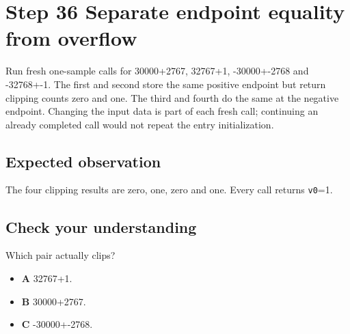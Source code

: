\section{Step 36 Separate endpoint equality from overflow}\label{pcm-s36}

Run fresh one-sample calls for 30000+2767, 32767+1, -30000+-2768 and -32768+-1. The first and second store the same positive endpoint but return clipping counts zero and one. The third and fourth do the same at the negative endpoint. Changing the input data is part of each fresh call; continuing an already completed call would not repeat the entry initialization.

\subsection{Expected observation}
The four clipping results are zero, one, zero and one. Every call returns \texttt{v0}=1.

\subsection{Check your understanding}
Which pair actually clips?

\begin{itemize}
  \item \textbf{A} 32767+1.
  \item \textbf{B} 30000+2767.
  \item \textbf{C} -30000+-2768.
\end{itemize}
